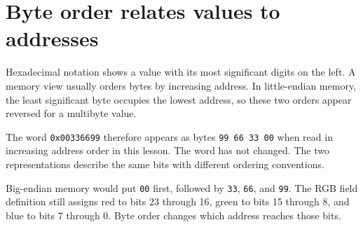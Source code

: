 \section{Byte order relates values to
  addresses}\label{002-single-pixel-p05-byte-order-relates-values-to-addresses}

Hexadecimal notation shows a value with its most significant digits on
the left. A memory view usually orders bytes by increasing address. In
little-endian memory, the least significant byte occupies the lowest
address, so these two orders appear reversed for a multibyte value.

The word \texttt{0x00336699} therefore appears as bytes
\texttt{99\ 66\ 33\ 00} when read in increasing address order in this
lesson. The word has not changed. The two representations describe the
same bits with different ordering conventions.

Big-endian memory would put \texttt{00} first, followed by \texttt{33},
\texttt{66}, and \texttt{99}. The RGB field definition still assigns red
to bits 23 through 16, green to bits 15 through 8, and blue to bits 7
through 0. Byte order changes which address reaches those bits.
